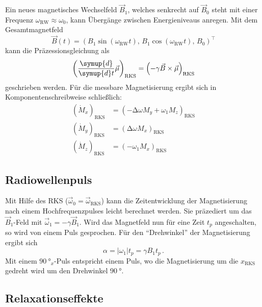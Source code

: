         \noindent Ein neues magnetisches Wechselfeld $\vec{B}_1$, welches senkrecht auf $\vec{B}_0$ steht mit einer Frequenz $\omega_\text{RW}\approx \omega_0$, kann Übergänge zwischen Energieniveaus anregen. 
        Mit dem Gesamtmagnetfeld 
        \begin{equation*}
            \vec{B}(t) = \left( B_1 \sin(\omega_\text{RW} t), \, B_1 \cos(\omega_\text{RW}t), \, B_0 \right)^\top
        \end{equation*}
        kann die Präzessionsgleichung als 
        \begin{equation*}
            \left(\frac{\symup{d}}{\symup{d}t} \vec{\mu}\right)_\text{RKS} =\left(- \gamma \vec{B} \times \vec{\mu}\right)_\text{RKS}
        \end{equation*}
        geschrieben werden. Für die messbare Magnetisierung ergibt sich in Komponentenschreibweise schließlich: 
        \begin{align*}
            \left(\dot{M}_x\right)_{\text{RKS}} & = \left(- \increment \omega M_y + \omega_1M_z \right)_{\text{RKS}} \\
            \left(\dot{M}_y\right)_{\text{RKS}} & = \left(\increment \omega M_x \right)_{\text{RKS}} \\
            \left(\dot{M}_z\right)_{\text{RKS}} & = \left( - \omega_1 M_x \right)_{\text{RKS}} 
        \end{align*} 

    \subsection{Radiowellenpuls}

        \noindent Mit Hilfe des RKS ($\vec{\omega}_0 = \vec{\omega}_\text{RKS}$) kann die Zeitentwicklung der Magnetisierung nach einem Hochfrequenzpulses leicht berechnet werden. 
        Sie präzediert um das $\vec{B}_1$-Feld mit $\vec{\omega}_1 = - \gamma \vec{B}_1$. 
        Wird das Magnetfeld nun für eine Zeit $t_p$ angeschalten, so wird von einem Puls gesprochen. Für den \enquote{Drehwinkel} der Magnetisierung ergibt sich 
        \begin{equation*}
            \alpha = |\omega_1| t_p = \gamma B_1 t_p\, .
        \end{equation*}
        Mit einem $\SI{90}{\degree}_x$-Puls entspricht einem Puls, wo die Magnetisierung um die $x_\text{RKS}$ gedreht wird um den Drehwinkel $\SI{90}{\degree}$. 


    \subsection{Relaxationseffekte}

